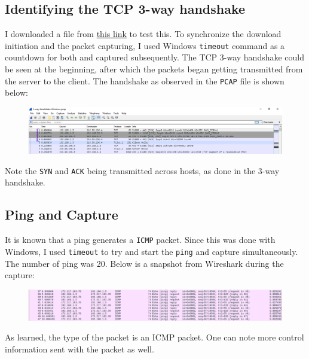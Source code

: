 \documentclass{article}
\begin{document}
\subsection{Identifying the TCP 3-way handshake}
\begin{flushleft}
I downloaded a file from \href{http://unec.edu.az/application/uploads/2014/12/pdf-sample.pdf}{this link} to test this. To synchronize the download initiation and the packet capturing, I used Windows \texttt{timeout} command as a countdown for both and captured subsequently. The TCP 3-way handshake could be seen at the beginning, after which the packets began getting transmitted from the server to the client. The handshake as observed in the \texttt{PCAP} file is shown below:
\begin{figure}[H]
\centering
\includegraphics[width=\linewidth]{3-way-handshake-identify.png}
\end{figure}

Note the \texttt{SYN} and \texttt{ACK} being transmitted across hosts, as done in the 3-way handshake.
\end{flushleft}

\subsection{Ping and Capture}
\begin{flushleft}
It is known that a ping generates a \texttt{ICMP} packet. Since this was done with Windows, I used \texttt{timeout} to try and start the \texttt{ping} and capture simultaneously. The number of ping was 20. Below is a snapshot from Wireshark during the capture:
\begin{figure}[H]
\centering
\includegraphics[width=\linewidth]{ping-snapshot.png}
\end{figure}

As learned, the type of the packet is an ICMP packet. One can note more control information sent with the packet as well.
\end{flushleft}
\end{document}
